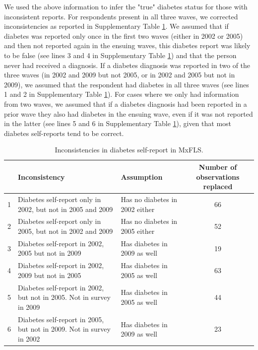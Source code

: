 \documentclass[12pt,english]{article}
\providecommand{\tabularnewline}{\\}
\begin{document}
We used the above information to infer the "true" diabetes status for those with inconsistent reports. For respondents present in all three waves, we corrected inconsistencies as reported in Supplementary Table \ref{tab:Inconsistencies}. We assumed that if diabetes was reported only once in the first two waves (either in 2002 or 2005) and then not reported again in the ensuing waves, this diabetes report was likely to be false (see lines 3 and 4 in Supplementary Table \ref{tab:Inconsistencies}) and that the person never had received a diagnosis. If a diabetes diagnosis was reported in two of the three waves (in 2002 and 2009 but not 2005, or in 2002 and 2005 but not in 2009), we assumed that the respondent had diabetes in all three waves (see lines 1 and 2 in Supplementary Table \ref{tab:Inconsistencies}). For cases where we only had information from two waves, we assumed that if a diabetes diagnosis had been reported in a prior wave they also had diabetes in the ensuing wave, even if it was not reported in the latter (see lines 5 and 6 in Supplementary Table \ref{tab:Inconsistencies}), given that most diabetes self-reports tend to be correct.

\begin{table}[!ht]
	\caption{\label{tab:Inconsistencies}Inconsistencies in diabetes self-report in MxFLS.}
	\begin{center}
		\begin{adjustbox}{max width=\linewidth} 
			\begin{tabular}{lllc}
				\hline 
				&Inconsistency  & Assumption  & Number of observations replaced\tabularnewline
				\hline 
				1 &Diabetes self-report only in 2002, but not in 2005 and 2009  & Has no diabetes in 2002 either  & 66\tabularnewline
				2 &Diabetes self-report only in 2005, but not in 2002 and 2009  & Has no diabetes in 2005 either  & 52\tabularnewline
				3 &Diabetes self-report in 2002, 2005 but not in 2009  & Has diabetes in 2009 as well  & 19\tabularnewline
				4 &Diabetes self-report in 2002, 2009 but not in 2005  & Has diabetes in 2005 as well  & 63\tabularnewline
				5 &Diabetes self-report in 2002, but not in 2005. Not in survey in 2009  & Has diabetes in 2005 as well  & 44\tabularnewline
				6 &Diabetes self-report in 2005, but not in 2009. Not in survey in 2002  & Has diabetes in 2009 as well  & 23\tabularnewline
				\hline 
			\end{tabular}
		\end{adjustbox}
	\end{center}
\end{table}
\end{document}
